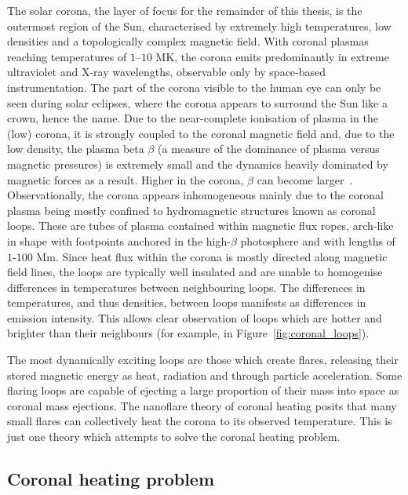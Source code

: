 The solar corona, the layer of focus for the remainder of this thesis, is the outermost region of the Sun, characterised by extremely high temperatures, low densities and a topologically complex magnetic field. With coronal plasmas reaching temperatures of $1$--$10$ MK, the corona emits predominantly in extreme ultraviolet and X-ray wavelengths, observable only by space-based instrumentation. The part of the corona visible to the human eye can only be seen during solar eclipses, where the corona appears to surround the Sun like a crown, hence the name. Due to the near-complete ionisation of plasma in the (low) corona, it is strongly coupled to the coronal magnetic field and, due to the low density, the plasma beta $\beta$ (a measure of the dominance of plasma versus magnetic pressures) is extremely small and the dynamics heavily dominated by magnetic forces as a result. Higher in the corona, $\beta$ can become larger~\cite{gomezPlasmaUpbetaEvolution2019}. Observationally, the corona appears inhomogeneous mainly due to the coronal plasma being mostly confined to hydromagnetic structures known as coronal loops. These are tubes of plasma contained within magnetic flux ropes, arch-like in shape with footpoints anchored in the high-$\beta$ photosphere and with lengths of $1$-$100$ Mm. Since heat flux within the corona is mostly directed along magnetic field lines, the loops are typically well insulated and are unable to homogenise differences in temperatures between neighbouring loops. The differences in temperatures, and thus densities, between loops manifests as differences in emission intensity. This allows clear observation of loops which are hotter and brighter than their neighbours (for example, in Figure~\ref{fig:coronal_loops}).

The most dynamically exciting loops are those which create flares, releasing their stored magnetic energy as heat, radiation and through particle acceleration. Some flaring loops are capable of ejecting a large proportion of their mass into space as coronal mass ejections. The nanoflare theory of coronal heating posits that many small flares can collectively heat the corona to its observed temperature. This is just one theory which attempts to solve the coronal heating problem.

\subsection{Coronal heating problem}

